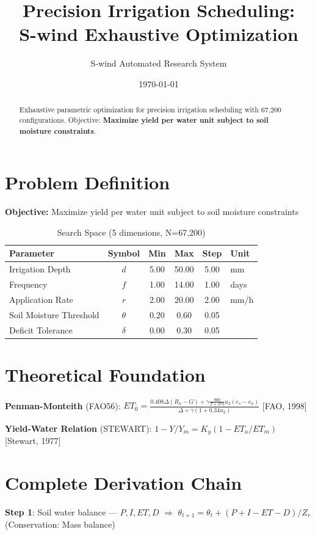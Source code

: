 \documentclass[11pt,twocolumn]{article}
\title{Precision Irrigation Scheduling: \\S-wind Exhaustive Optimization}
\author{S-wind Automated Research System}
\date{\today}
\begin{document}
\maketitle

\begin{abstract}
Exhaustive parametric optimization for precision irrigation scheduling with 67,200 configurations.
Objective: \textbf{Maximize yield per water unit subject to soil moisture constraints}.
\end{abstract}

\section{Problem Definition}
\textbf{Objective:} Maximize yield per water unit subject to soil moisture constraints

\begin{table}[h]
\centering
\caption{Search Space (5 dimensions, N=67,200)}
\begin{tabular}{@{}lccccl@{}}
\toprule
Parameter & Symbol & Min & Max & Step & Unit \\
\midrule
Irrigation Depth & $d$ & 5.00 & 50.00 & 5.00 & mm \\
Frequency & $f$ & 1.00 & 14.00 & 1.00 & days \\
Application Rate & $r$ & 2.00 & 20.00 & 2.00 & mm/h \\
Soil Moisture Threshold & $\theta$ & 0.20 & 0.60 & 0.05 &  \\
Deficit Tolerance & $\delta$ & 0.00 & 0.30 & 0.05 &  \\
\bottomrule
\end{tabular}
\end{table}

\section{Theoretical Foundation}
\textbf{Penman-Monteith} (FAO56): $ET_0 = \frac{0.408\Delta(R_n-G)+\gamma\frac{900}{T+273}u_2(e_s-e_a)}{\Delta+\gamma(1+0.34u_2)}$ [FAO, 1998]

\textbf{Yield-Water Relation} (STEWART): $1-Y/Y_m = K_y(1-ET_a/ET_m)$ [Stewart, 1977]


\section{Complete Derivation Chain}
\textbf{Step 1}: Soil water balance --- $P, I, ET, D$ $\Rightarrow$ $\theta_{t+1} = \theta_t + (P + I - ET - D)/Z_r$ (Conservation: Mass balance)
\end{document}
